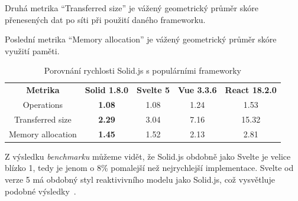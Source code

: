 Druhá metrika ``Transferred size'' je vážený geometrický průměr skóre přenesených dat po síti při použití daného frameworku.

Poslední metrika ``Memory allocation'' je vážený geometrický průměr skóre využití paměti.


\begin{table}[ht]
      \begin{ctucolortab}
            \begin{tabular}{c c c c c}
                  \bfseries Metrika & \bfseries{Solid 1.8.0} & \bfseries{Svelte 5} & \bfseries{Vue 3.3.6} & \bfseries{React 18.2.0} \\\Midrule{}
                  Operations        & \textbf{1.08}          & 1.08                & 1.24                 & 1.53                    \\
                  Transferred size  & \textbf{2.29}          & 3.04                & 7.16                 & 15.32                   \\
                  Memory allocation & \textbf{1.45}          & 1.52                & 2.13                 & 2.81
            \end{tabular}
      \end{ctucolortab}
      \caption{Porovnání rychlosti Solid.js s populárními frameworky}
      \label{tab:technology1}
\end{table}

Z výsledku \textit{benchmarku} můžeme vidět, že Solid.js obdobně jako Svelte je velice blízko 1, tedy je jenom o 8\% pomalejší než nejrychlejší implementace.
Svelte od verze 5 má obdobný styl reaktivivního modelu jako Solid.js, což vysvětluje podobné výsledky~\cite{svelte-reactivity}.




